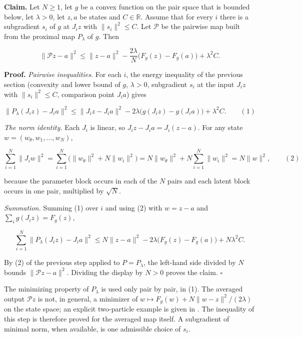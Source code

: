 \documentclass[11pt,a4paper]{article}
\begin{document}
\textbf{Claim.} Let \(N\ge1\), let \(g\) be a convex function on the pair space that is bounded below, let \(\lambda>0\), let \(z,a\) be states and \(C\in\mathbb R\). Assume that for every \(i\) there is a subgradient \(s_i\) of \(g\) at \(J_iz\) with \(\|s_i\|^2\le C\). Let \(\mathcal P\) be the pairwise map built from the proximal map \(P_\lambda\) of \(g\). Then


\[\|\mathcal Pz-a\|^2\le\|z-a\|^2-\frac{2\lambda}{N}\bigl(F_g(z)-F_g(a)\bigr)+\lambda^2C .\]


\textbf{Proof.} \emph{Pairwise inequalities.} For each \(i\), the energy inequality of the previous section (convexity and lower bound of \(g\), \(\lambda>0\), subgradient \(s_i\) at the input \(J_iz\) with \(\|s_i\|^2\le C\), comparison point \(J_ia\)) gives


\[\|P_\lambda(J_iz)-J_ia\|^2\le\|J_iz-J_ia\|^2-2\lambda\bigl(g(J_iz)-g(J_ia)\bigr)+\lambda^2C.\qquad(1)\]


\emph{The norm identity.} Each \(J_i\) is linear, so \(J_iz-J_ia=J_i(z-a)\). For any state \(w=(w_\theta,w_1,\dots,w_N)\),


\[\sum_{i=1}^N\|J_iw\|^2=\sum_{i=1}^N\bigl(\|w_\theta\|^2+N\|w_i\|^2\bigr)=N\|w_\theta\|^2+N\sum_{i=1}^N\|w_i\|^2=N\|w\|^2,\qquad(2)\]


because the parameter block occurs in each of the \(N\) pairs and each latent block occurs in one pair, multiplied by \(\sqrt N\).




\emph{Summation.} Summing (1) over \(i\) and using (2) with \(w=z-a\) and \(\sum_ig(J_iz)=F_g(z)\),


\[\sum_{i=1}^N\|P_\lambda(J_iz)-J_ia\|^2\le N\|z-a\|^2-2\lambda\bigl(F_g(z)-F_g(a)\bigr)+N\lambda^2C .\]


By (2) of the previous step applied to \(P=P_\lambda\), the left-hand side divided by \(N\) bounds \(\|\mathcal Pz-a\|^2\). Dividing the display by \(N>0\) proves the claim. \(\square\)




The minimizing property of \(P_\lambda\) is used only pair by pair, in (1). The averaged output \(\mathcal Pz\) is not, in general, a minimizer of \(w\mapsto F_g(w)+N\|w-z\|^2/(2\lambda)\) on the state space; an explicit two-particle example is given in \cite[Section~3.50.4]{LangevinLean2026Proximal}. The inequality of this step is therefore proved for the averaged map itself. A subgradient of minimal norm, when available, is one admissible choice of \(s_i\).
\end{document}
